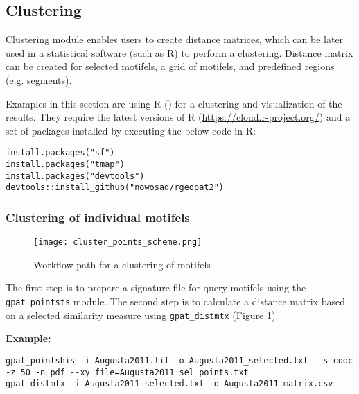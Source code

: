\FloatBarrier

\subsection{Clustering}

Clustering module enables users to create distance matrices, which can be later used in a statistical software (such as R) to perform a clustering.
Distance matrix can be created for selected motifels, a grid of motifels, and predefined regions (e.g. segments).

Examples in this section are using R (\cite{R}) for a clustering and visualization of the results. 
They require the latest versions of R (\url{https://cloud.r-project.org/}) and a set of packages installed by executing the below code in R:

\begin{minipage}{\linewidth}
\begin{lstlisting}
install.packages("sf")
install.packages("tmap")
install.packages("devtools")
devtools::install_github("nowosad/rgeopat2")
\end{lstlisting}
\end{minipage}

\subsubsection{Clustering of individual motifels}

\begin{figure}[H]
	\centering
	\texttt{[image: cluster\_points\_scheme.png]}
	\caption{Workflow path for a clustering of motifels}
	\label{FIG:CLUSTER_POINTS}
\end{figure}

The first step is to prepare a signature file for query motifels using the {\tt gpat\_pointsts} module. 
The second step is to calculate a distance matrix based on a selected similarity measure using {\tt gpat\_distmtx} (Figure \ref{FIG:CLUSTER_POINTS}).

{\bf Example:}

\begin{minipage}{\linewidth}
\begin{lstlisting}
gpat_pointshis -i Augusta2011.tif -o Augusta2011_selected.txt  -s cooc -z 50 -n pdf --xy_file=Augusta2011_sel_points.txt
gpat_distmtx -i Augusta2011_selected.txt -o Augusta2011_matrix.csv
\end{lstlisting}
\end{minipage}

